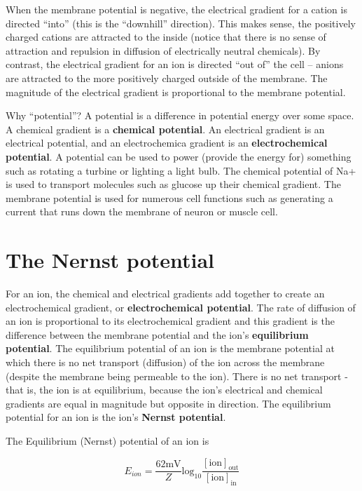 \documentclass[]{book}
\begin{document}
When the membrane potential is negative, the electrical gradient for a
cation is directed ``into'' (this is the ``downhill'' direction). This
makes sense, the positively charged cations are attracted to the inside
(notice that there is no sense of attraction and repulsion in diffusion
of electrically neutral chemicals). By contrast, the electrical gradient
for an ion is directed ``out of'' the cell -- anions are attracted to
the more positively charged outside of the membrane. The magnitude of
the electrical gradient is proportional to the membrane potential.

Why ``potential''? A potential is a difference in potential energy over
some space. A chemical gradient is a \textbf{chemical potential}. An
electrical gradient is an electrical potential, and an electrochemica
gradient is an \textbf{electrochemical potential}. A potential can be
used to power (provide the energy for) something such as rotating a
turbine or lighting a light bulb. The chemical potential of Na+ is used
to transport molecules such as glucose up their chemical gradient. The
membrane potential is used for numerous cell functions such as
generating a current that runs down the membrane of neuron or muscle
cell.

\section{The Nernst potential}\label{the-nernst-potential}

For an ion, the chemical and electrical gradients add together to create
an electrochemical gradient, or \textbf{electrochemical potential}. The
rate of diffusion of an ion is proportional to its electrochemical
gradient and this gradient is the difference between the membrane
potential and the ion's \textbf{equilibrium potential}. The equilibrium
potential of an ion is the membrane potential at which there is no net
transport (diffusion) of the ion across the membrane (despite the
membrane being permeable to the ion). There is no net transport - that
is, the ion is at equilibrium, because the ion's electrical and chemical
gradients are equal in magnitude but opposite in direction. The
equilibrium potential for an ion is the ion's \textbf{Nernst potential}.

The Equilibrium (Nernst) potential of an ion is

\begin{equation}
E_{ion} = \frac{62 \mathrm{mV}}{Z} \mathrm{log}_{10} \frac{[\mathrm{ion}]_{\mathrm{out}}}{[\mathrm{ion}]_{\mathrm{in}}}
\end{equation}
\end{document}
